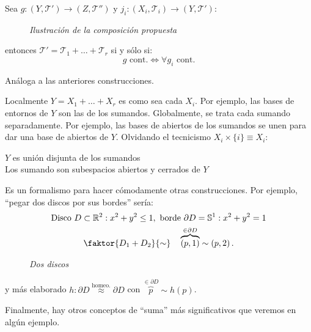 \begin{theo}
Sea $g: \left( Y, \mathcal{T}' \right) \rightarrow \left( Z, \mathcal{T}'' \right)$ y $j_i: \left( X_i, \mathcal{T}_i \right) \rightarrow \left( Y, \mathcal{T}' \right)$:
    \begin{figure}[H]
        \centering    
        \caption{\textit{Ilustración de la composición propuesta}}
        \label{prop_universal_sum_finitas}
    \end{figure}

entonces $\mathcal{T}' = \mathcal{T}_1 + \ldots + \mathcal{T}_r$ si y sólo si:
\[
g \text{ cont.} \Leftrightarrow \forall g_i \text{ cont.}
\]
\end{theo}
\begin{demo}
    Análoga a las anteriores construcciones.
\end{demo}

\begin{pg}
Localmente $Y = X_1 + \ldots + X_r$ es como sea cada $X_i$. Por ejemplo, las bases de entornos de $Y$ son las de los sumandos. Globalmente, se trata cada sumando separadamente. Por ejemplo, las bases de abiertos de los sumandos se unen para dar una base de abiertos de $Y$. Olvidando el tecnicismo $X_i \times \{i\} \equiv X_i$:
\begin{center}
   $Y$ es unión disjunta de los sumandos\\
   Los sumando son subespacios abiertos y cerrados de $Y$
\end{center}
Es un formalismo para hacer cómodamente otras construcciones. Por ejemplo, ``pegar dos discos por sus bordes'' sería:
\begin{gather*}
    \text{Disco } D \subset \mathbb{R}^2: x^2 + y^2 \le 1, \text{ borde } \partial D = \mathbb{S}^1: x^2 + y^2 = 1\\
    \faktor{D_1 + D_2}{\sim} \quad \overbrace{\left( p, 1 \right)}^{\in \partial D} \sim \left( p, 2 \right) 
.\end{gather*}

\begin{figure}[H]
    \centering
    \caption{\textit{Dos discos}}
    \label{fig:dos-discos.}
\end{figure}
y más elaborado $h: \partial D \stackrel{\text{homeo.}}{\approx} \partial D$ con $\overbrace{p}^{\in \partial D} \sim h\left( p \right)$.

Finalmente, hay otros conceptos de ``suma'' más significativos que veremos en algún ejemplo.
\end{pg}


